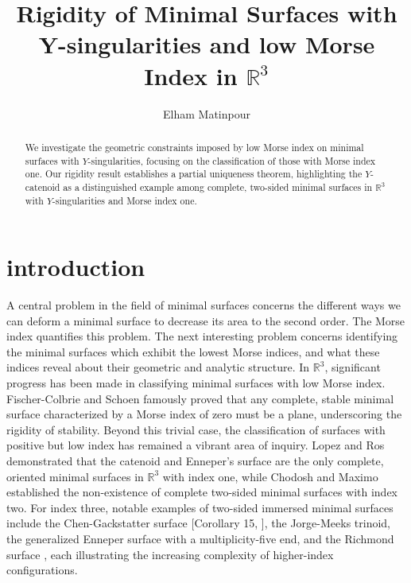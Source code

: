 \documentclass[11pt]{amsart}
\title{Rigidity of Minimal Surfaces with Y-singularities and low Morse Index  in $\mathbb{R}^3$}
\author{Elham Matinpour}
\numberwithin{equation}{section}
\theoremstyle{theorem}
\theoremstyle{definition}
\numberwithin{equation}{section}
\begin{document}
\maketitle


\begin{abstract}  
We investigate the geometric constraints imposed by low Morse index on minimal surfaces with $Y$-singularities, focusing on the classification of those with Morse index one. Our rigidity result establishes a partial uniqueness theorem, highlighting the $Y$-catenoid as a distinguished example among complete, two-sided minimal surfaces in $\mathbb{R}^3$ with $Y$-singularities and Morse index one.
\end{abstract}


\section{introduction}

A central problem in the field of minimal surfaces concerns the different ways we can deform a minimal surface to decrease its area to the second order. The Morse index quantifies this problem. The next interesting problem concerns identifying the minimal surfaces which exhibit the lowest Morse indices, and what these indices reveal about their geometric and analytic structure. In $\mathbb{R}^3$, significant progress has been made in classifying minimal surfaces with low Morse index. Fischer-Colbrie and Schoen \cite{fischer1980structure} famously proved that any complete, stable minimal surface characterized by a Morse index of zero must be a plane, underscoring the rigidity of stability. Beyond this trivial case, the classification of surfaces with positive but low index has remained a vibrant area of inquiry. Lopez and Ros \cite{lopez1989complete} demonstrated that the catenoid and Enneper’s surface are the only complete, oriented minimal surfaces in $\mathbb{R}^3$  with index one, while Chodosh and Maximo \cite{chodosh2023topology} established the non-existence of complete two-sided minimal surfaces with index two. For index three, notable examples of two-sided immersed minimal surfaces include the Chen-Gackstatter surface [Corollary 15, \cite{montiel1991schrodinger}], the Jorge-Meeks trinoid, the generalized Enneper surface with a multiplicity-five end, and the Richmond surface \cite{tuzhilin1992morse}, each illustrating the increasing complexity of higher-index configurations.
\medskip
\end{document}
